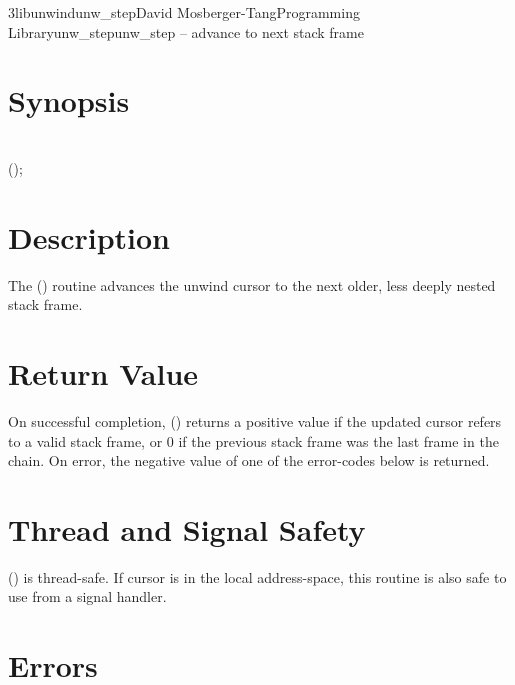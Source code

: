 \documentclass{article}
\begin{document}
\begin{Name}{3libunwind}{unw\_step}{David Mosberger-Tang}{Programming Library}{unw\_step}unw\_step -- advance to next stack frame
\end{Name}

\section{Synopsis}

\\

 ();\\

\section{Description}

The () routine advances the unwind cursor  to
the next older, less deeply nested stack frame.

\section{Return Value}

On successful completion, () returns a positive value
if the updated cursor refers to a valid stack frame, or 0 if the
previous stack frame was the last frame in the chain.  On error, the
negative value of one of the error-codes below is returned.

\section{Thread and Signal Safety}

() is thread-safe.  If cursor  is in the local
address-space, this routine is also safe to use from a signal handler.

\section{Errors}
\end{document}
